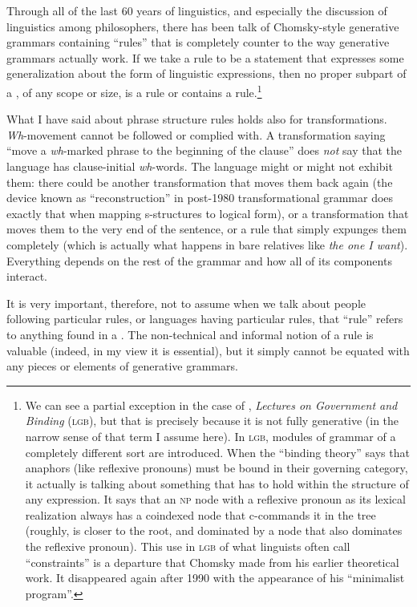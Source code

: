 \documentclass[output=paper]{langscibook}
\begin{document}
Through all of the last 60 years of linguistics, and especially the discussion of linguistics among philosophers, there has been talk of Chomsky-style generative grammars containing ``rules'' that is completely counter to the way generative grammars actually work. If we take a rule to be a statement that expresses some generalization about the form of linguistic expressions, then no proper subpart of a , of any scope or size, is a rule or contains a rule.\footnote{We can see a partial exception in the case of \citet{Chomsky81}, \textit{Lectures on Government and Binding} (\textsc{lgb}), but that is precisely because it is not fully generative (in the narrow sense of that term I assume here). In \textsc{lgb}, modules of grammar of a completely different sort are introduced. When the ``binding theory'' says that anaphors (like reflexive pronouns) must be bound in their governing category, it actually is talking about something that has to hold within the structure of any expression. It says that an \textsc{np} node with a reflexive pronoun as its lexical realization always has a coindexed node that c-commands it in the tree (roughly, is closer to the root, and dominated by a node that also dominates the reflexive pronoun).  This use in \textsc{lgb} of what linguists often call ``constraints'' is a departure that Chomsky made from his earlier theoretical work. It disappeared again after 1990 with the appearance of his ``minimalist program''.}

What I have said about phrase structure rules holds also for transformations. \textit{Wh}-movement cannot be followed or complied with. A transformation saying ``move a \textit{wh}-marked phrase to the beginning of the clause'' does \emph{not} say that the language has clause-initial \textit{wh}-words. The language might or might not exhibit them: there could be another transformation that moves them back again (the device known as ``reconstruction'' in post-1980 transformational grammar does exactly that when mapping s-structures to logical form), or a transformation that moves them to the very end of the sentence, or a rule that simply expunges them completely (which is actually what happens in bare relatives like \textit{the one I want}). Everything depends on the rest of the grammar and how all of its components interact.

It is very important, therefore, not to assume when we talk about people following particular rules, or languages having particular rules, that ``rule'' refers to anything found in a . The non-technical and informal notion of a rule is valuable (indeed, in my view it is essential), but it simply cannot be equated with any pieces or elements of generative grammars.
\end{document}
